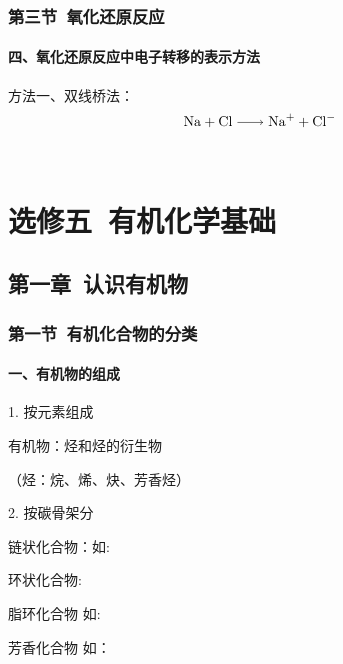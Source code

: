\documentclass{book}
\begin{document}
\section{第三节\  氧化还原反应}

\subsection{四、氧化还原反应中电子转移的表示方法}
方法一、双线桥法： \\
\[
\ce{{\ccoord{1}} Na + {\bcoord{c}} Cl -> {\ccoord{2}} Na+  + {\bcoord{d}} Cl-}
\]

\\[0.5cm] 







\part{选修五\ 有机化学基础}

\chapter{第一章\ 认识有机物}

\section{第一节\ 有机化合物的分类}	

\subsection{一、有机物的组成}
1. 按元素组成 \par
有机物：烃和烃的衍生物 \par
（烃：烷、烯、炔、芳香烃）
\newline \par
2. 按碳骨架分\par
链状化合物：如:
\newline \par
环状化合物:\par
脂环化合物 如:\hspace{0.8mm} \par
芳香化合物 如：
\newline \par
\end{document}
